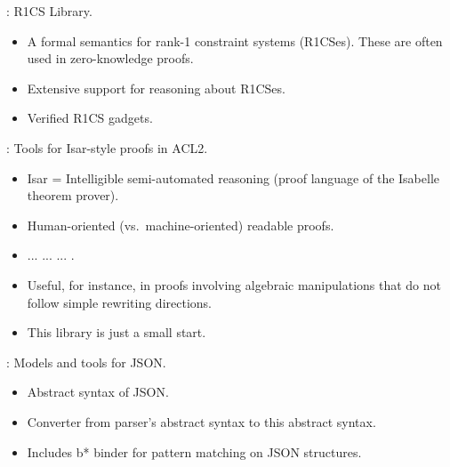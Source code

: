 \begin{frame}

\newlibtitle

: R1CS Library.
\begin{itemize}
\item A formal semantics for rank-1 constraint systems (R1CSes). These
  are often used in zero-knowledge proofs.
\item Extensive support for reasoning about R1CSes.
\item Verified R1CS gadgets.
\end{itemize}

\end{frame}


\begin{frame}

\newlibtitle

:
Tools for Isar-style proofs in ACL2.
\begin{itemize}
\item Isar = Intelligible semi-automated reasoning
      (proof language of the Isabelle theorem prover).
\item Human-oriented (vs.\ machine-oriented) readable proofs.
\item {} ...  ...  ... .
\item Useful, for instance, in proofs involving algebraic manipulations
      that do not follow simple rewriting directions.
\item This library is just a small start.
\end{itemize}

\end{frame}


\begin{frame}

\newlibtitle

:
Models and tools for JSON.
\begin{itemize}
\item Abstract syntax of JSON.
\item Converter from parser's abstract syntax to this abstract syntax.
\item Includes b* binder for pattern matching on JSON structures.
\end{itemize}

\end{frame}

